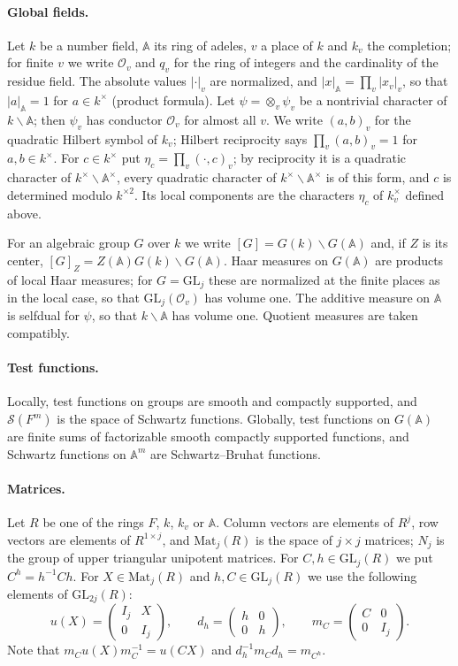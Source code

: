 \documentclass[11pt,oneside,notitlepage]{book}
\numberwithin{equation}{section}
\theoremstyle{plain}
\theoremstyle{definition}
\newcommand{\A}{\mathbb{A}}
\newcommand{\cO}{\mathcal{O}}
\newcommand{\GL}{\mathrm{GL}}
\newcommand{\Mat}{\mathrm{Mat}}
\newcommand{\cS}{\mathcal{S}}
\newcommand{\hil}[2]{(#1,#2)}
\begin{document}
\paragraph{Global fields.}
Let $k$ be a number field, $\A$ its ring of adeles, $v$ a place of $k$ and $k_v$ the completion; for finite $v$ we write $\cO_v$ and $q_v$ for the ring of integers and the cardinality of the residue field. The absolute values $|\cdot|_v$ are normalized, and $|x|_\A=\prod_v|x_v|_v$, so that $|a|_\A=1$ for $a\in k^\times$ (product formula). Let $\psi=\otimes_v\psi_v$ be a nontrivial character of $k\backslash\A$; then $\psi_v$ has conductor $\cO_v$ for almost all $v$. We write $\hil ab_v$ for the quadratic Hilbert symbol of $k_v$; Hilbert reciprocity says $\prod_v\hil ab_v=1$ for $a,b\in k^\times$. For $c\in k^\times$ put $\eta_c=\prod_v\hil{\cdot}{c}_v$; by reciprocity it is a quadratic character of $k^\times\backslash\A^\times$, every quadratic character of $k^\times\backslash\A^\times$ is of this form, and $c$ is determined modulo $k^{\times2}$. Its local components are the characters $\eta_{c}$ of $k_v^\times$ defined above.

For an algebraic group $G$ over $k$ we write $[G]=G(k)\backslash G(\A)$ and, if $Z$ is its center, $[G]_Z=Z(\A)G(k)\backslash G(\A)$. Haar measures on $G(\A)$ are products of local Haar measures; for $G=\GL_j$ these are normalized at the finite places as in the local case, so that $\GL_j(\cO_v)$ has volume one. The additive measure on $\A$ is selfdual for $\psi$, so that $k\backslash\A$ has volume one. Quotient measures are taken compatibly.

\paragraph{Test functions.}
Locally, test functions on groups are smooth and compactly supported, and $\cS(F^m)$ is the space of Schwartz functions. Globally, test functions on $G(\A)$ are finite sums of factorizable smooth compactly supported functions, and Schwartz functions on $\A^m$ are Schwartz--Bruhat functions.

\paragraph{Matrices.}
Let $R$ be one of the rings $F$, $k$, $k_v$ or $\A$. Column vectors are elements of $R^j$, row vectors are elements of $R^{1\times j}$, and $\Mat_j(R)$ is the space of $j\times j$ matrices; $N_j$ is the group of upper triangular unipotent matrices. For $C,h\in\GL_j(R)$ we put $C^h=h^{-1}Ch$. For $X\in\Mat_{j}(R)$ and $h,C\in\GL_j(R)$ we use the following elements of $\GL_{2j}(R)$:
\[
u(X)=\begin{pmatrix} I_j & X\\ 0& I_j\end{pmatrix},\qquad d_h=\begin{pmatrix} h&0\\0&h\end{pmatrix},\qquad m_C=\begin{pmatrix} C&0\\0&I_j\end{pmatrix}.
\]
Note that $m_C u(X) m_C^{-1}=u(CX)$ and $d_h^{-1}m_Cd_h=m_{C^h}$.
\end{document}
